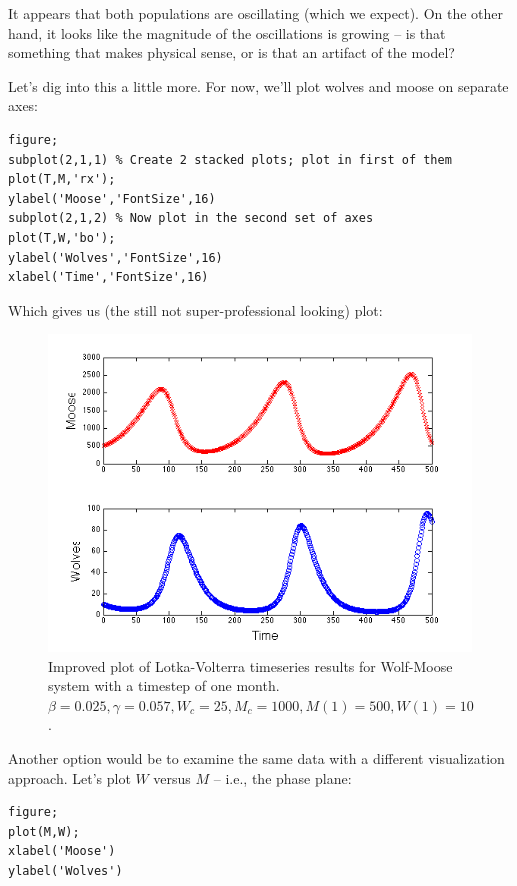 \documentclass{tufte-handout}
\begin{document}
It appears that both populations are oscillating (which we expect).  On the other hand, it looks like the magnitude of the oscillations is growing -- is that something that makes physical sense, or is that an artifact of the model?

Let's dig into this a little more.  For now, we'll plot wolves and moose on separate axes:

\begin{verbatim}
figure;
subplot(2,1,1) % Create 2 stacked plots; plot in first of them
plot(T,M,'rx');
ylabel('Moose','FontSize',16)
subplot(2,1,2) % Now plot in the second set of axes
plot(T,W,'bo');
ylabel('Wolves','FontSize',16)
xlabel('Time','FontSize',16)
\end{verbatim}

Which gives us (the still not super-professional looking) plot: 

\begin{figure}[h!]
\includegraphics[width=4.5in]{figs/StackedWolfMooseTImeSeries}
\caption{Improved plot of Lotka-Volterra timeseries results for Wolf-Moose system with a timestep of one month.  $\beta = 0.025, \gamma = 0.057, W_c = 25, M_c=1000, M(1) = 500, W(1) = 10$.}
\end{figure}

Another option would be to examine the same data with a different visualization approach.  Let's plot $W$ versus $M$ -- i.e., the phase plane:

\begin{verbatim}
figure;
plot(M,W);
xlabel('Moose')
ylabel('Wolves')
\end{verbatim}
\end{document}
